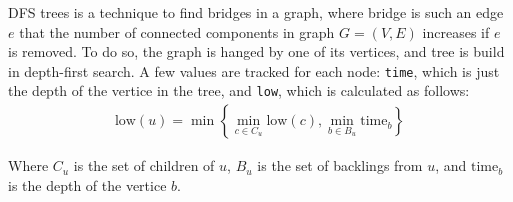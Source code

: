 DFS trees is a technique to find bridges in a graph, where bridge is such an edge $e$ that the number of connected components in graph $G = (V, E)$ increases if $e$ is removed. To do so, the graph is hanged by one of its vertices, and tree is build in depth-first search. A few values are tracked for each node: \verb|time|, which is just the depth of the vertice in the tree, and \verb|low|, which is calculated as follows:
\begin{align*}
  \text{low}(u) = \min\left\{ \min\limits_{c \in C_u} \text{low}(c), \min\limits_{b \in B_u} \text{time}_b \right\}
\end{align*}

Where $C_u$ is the set of children of $u$, $B_u$ is the set of backlings from $u$, and $\text{time}_b$ is the depth of the vertice $b$.


